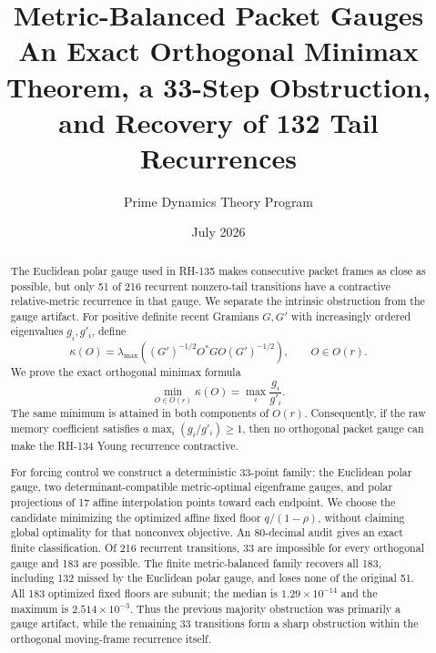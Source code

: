 \documentclass[12pt]{article}
\title{Metric-Balanced Packet Gauges\\\large An Exact Orthogonal Minimax Theorem, a 33-Step Obstruction, and Recovery of 132 Tail Recurrences}
\author{Prime Dynamics Theory Program}
\date{July 2026}
\begin{document}
\maketitle

\begin{abstract}
The Euclidean polar gauge used in RH-135 makes consecutive packet frames as
close as possible, but only 51 of 216 recurrent nonzero-tail transitions have
a contractive relative-metric recurrence in that gauge.  We separate the
intrinsic obstruction from the gauge artifact.  For positive definite recent
Gramians $G,G'$ with increasingly ordered eigenvalues $g_i,g'_i$, define
\[
 \kappa(O)=\lambda_{\max}\!\left((G')^{-1/2}O^*GO(G')^{-1/2}\right),
 \qquad O\in O(r).
\]
We prove the exact orthogonal minimax formula
\[
 \min_{O\in O(r)}\kappa(O)=\max_i\frac{g_i}{g'_i}.
\]
The same minimum is attained in both components of $O(r)$.  Consequently, if
the raw memory coefficient satisfies $a\max_i(g_i/g'_i)\geq1$, then no
orthogonal packet gauge can make the RH-134 Young recurrence contractive.

For forcing control we construct a deterministic 33-point family: the
Euclidean polar gauge, two determinant-compatible metric-optimal eigenframe
gauges, and polar projections of 17 affine interpolation points toward each
endpoint.  We choose the candidate minimizing the optimized affine fixed
floor $q/(1-\rho)$, without claiming global optimality for that nonconvex
objective.  An 80-decimal audit gives an exact finite classification.  Of 216
recurrent transitions, 33 are impossible for every orthogonal gauge and 183
are possible.  The finite metric-balanced family recovers all 183, including
132 missed by the Euclidean polar gauge, and loses none of the original 51.
All 183 optimized fixed floors are subunit; the median is
$1.29\times10^{-14}$ and the maximum is $2.514\times10^{-3}$.  Thus the
previous majority obstruction was primarily a gauge artifact, while the
remaining 33 transitions form a sharp obstruction within the orthogonal
moving-frame recurrence itself.
\end{abstract}
\end{document}

